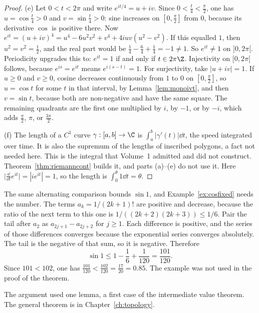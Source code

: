 \begin{proof}
(e) Let $0<t<2\pi$ and write $e^{it/4}=u+iv$. Since $0<\frac t4<\frac\pi2$, one has $u=\cos\frac t4>0$ and $v=\sin\frac t4>0$: sine increases on $[0,\frac\pi2]$ from $0$, because its derivative $\cos$ is positive there. Now $e^{it}=(u+iv)^4=u^4-6u^2v^2+v^4+4iuv(u^2-v^2)$. If this equalled $1$, then $u^2=v^2=\frac12$, and the real part would be $\frac14-\frac64+\frac14=-1\ne1$. So $e^{it}\ne1$ on $]0,2\pi[$. Periodicity upgrades this to: $e^{it}=1$ if and only if $t\in2\pi\Z$. Injectivity on $[0,2\pi[$ follows, because $e^{is}=e^{it}$ means $e^{i(s-t)}=1$. For surjectivity, take $|u+iv|=1$. If $u\ge0$ and $v\ge0$, cosine decreases continuously from $1$ to $0$ on $[0,\frac\pi2]$, so $u=\cos t$ for some $t$ in that interval, by Lemma~\ref{lem:monoivt}, and then $v=\sin t$, because both are non-negative and have the same square. The remaining quadrants are the first one multiplied by $i$, by $-1$, or by $-i$, which adds $\frac\pi2$, $\pi$, or $\frac{3\pi}2$.

(f) The length of a $C^1$ curve $\gamma:[a,b]\to\C$ is $\int_a^b|\gamma'(t)|\dd t$, the speed integrated over time. It is also the supremum of the lengths of inscribed polygons, a fact not needed here. This is the integral that Volume~1 admitted and did not construct. Theorem~\ref{thm:riemanncont} builds it, and parts (a)--(e) do not use it. Here $\bigl|\frac{\dd}{\dd t}e^{it}\bigr|=|ie^{it}|=1$, so the length is $\int_0^\theta 1\dd t=\theta$.
\end{proof}

The same alternating comparison bounds $\sin1$, and Example~\ref{ex:cosfixed} needs the number. The terms $a_k=1/(2k+1)!$ are positive and decrease, because the ratio of the next term to this one is $1/((2k+2)(2k+3))\le1/6$. Pair the tail after $a_2$ as $a_{2j+1}-a_{2j+2}$ for $j\ge1$. Each difference is positive, and the series of those differences converges because the exponential series converges absolutely. The tail is the negative of that sum, so it is negative. Therefore
\[
\sin1\le1-\frac16+\frac1{120}=\frac{101}{120}.
\]
Since $101<102$, one has $\frac{101}{120}<\frac{102}{120}=\frac{17}{20}=0.85$. The example was not used in the proof of the theorem.

The argument used one lemma, a first case of the intermediate value theorem. The general theorem is in Chapter~\ref{ch:topology}.

